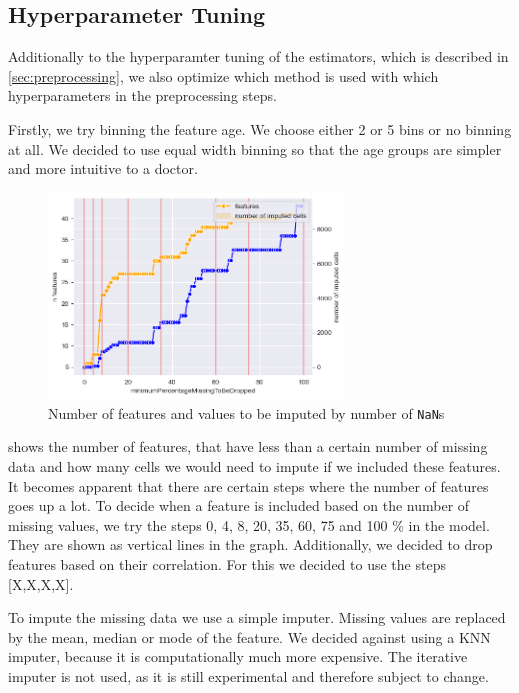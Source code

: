 \subsection{Hyperparameter Tuning} \label{subsec:hyperparametertuning}
Additionally to the hyperparamter tuning of the estimators, which is described in \cref{sec:preprocessing}, we also optimize which method is used with which hyperparameters in the preprocessing steps.

Firstly, we try binning the feature age. We choose either 2 or 5 bins or no binning at all. We decided to use equal width binning so that the age groups are simpler and more intuitive to a doctor.

\begin{figure}[h]
	\centering
	\includegraphics[width=0.7\textwidth]{images/percentageToBeDropped.png}
	\caption{Number of features and values to be imputed by number of \texttt{NaN}s}
	\label{fig:percentageToBeDropped}
\end{figure}

  shows the number of features, that have less than a certain number of missing data and how many cells we would need to impute if we included these features. It becomes apparent that there are certain steps where the number of features goes up a lot. To decide when a feature is included based on the number of missing values, we try the steps 0, 4, 8, 20, 35, 60, 75 and 100 \% in the model. They are shown as vertical lines in the graph.  Additionally, we decided to drop features based on their correlation. For this we decided to use the steps [X,X,X,X].

To impute the missing data we use a simple imputer. Missing values are replaced by the mean, median or mode of the feature. We decided against using a KNN imputer, because it is computationally much more expensive. The iterative imputer is not used, as it is still experimental and therefore subject to change.

